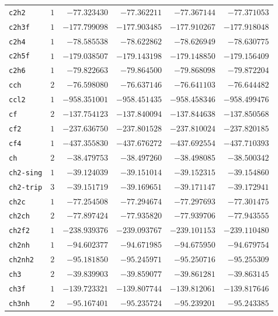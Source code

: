 {\begin{longtable}{@{}lrrrrr@{}}
    \texttt{c2h2} & $1$ & $-77.323430$ & $-77.362211$ & $-77.367144$ & $-77.371053$ \\
    \texttt{c2h3f} & $1$ & $-177.799098$ & $-177.903485$ & $-177.910267$ & $-177.918048$ \\
    \texttt{c2h4} & $1$ & $-78.585538$ & $-78.622862$ & $-78.626949$ & $-78.630775$ \\
    \texttt{c2h5f} & $1$ & $-179.038507$ & $-179.143198$ & $-179.148850$ & $-179.156409$ \\
    \texttt{c2h6} & $1$ & $-79.822663$ & $-79.864500$ & $-79.868098$ & $-79.872204$ \\
    \texttt{cch} & $2$ & $-76.598080$ & $-76.637146$ & $-76.641103$ & $-76.644482$ \\
    \texttt{ccl2} & $1$ & $-958.351001$ & $-958.451435$ & $-958.458346$ & $-958.499476$ \\
    \texttt{cf} & $2$ & $-137.754123$ & $-137.840094$ & $-137.844638$ & $-137.850568$ \\
    \texttt{cf2} & $1$ & $-237.636750$ & $-237.801528$ & $-237.810024$ & $-237.820185$ \\
    \texttt{cf4} & $1$ & $-437.355830$ & $-437.676272$ & $-437.692554$ & $-437.710393$ \\
    \texttt{ch} & $2$ & $-38.479753$ & $-38.497260$ & $-38.498085$ & $-38.500342$ \\
    \texttt{ch2-sing} & $1$ & $-39.124039$ & $-39.151014$ & $-39.152315$ & $-39.154860$ \\
    \texttt{ch2-trip} & $3$ & $-39.151719$ & $-39.169651$ & $-39.171147$ & $-39.172941$ \\
    \texttt{ch2c} & $1$ & $-77.254508$ & $-77.294674$ & $-77.297693$ & $-77.301475$ \\
    \texttt{ch2ch} & $2$ & $-77.897424$ & $-77.935820$ & $-77.939706$ & $-77.943555$ \\
    \texttt{ch2f2} & $1$ & $-238.939376$ & $-239.093767$ & $-239.101153$ & $-239.110480$ \\
    \texttt{ch2nh} & $1$ & $-94.602377$ & $-94.671985$ & $-94.675950$ & $-94.679754$ \\
    \texttt{ch2nh2} & $2$ & $-95.181850$ & $-95.245971$ & $-95.250716$ & $-95.255309$ \\
    \texttt{ch3} & $2$ & $-39.839903$ & $-39.859077$ & $-39.861281$ & $-39.863145$ \\
    \texttt{ch3f} & $1$ & $-139.723321$ & $-139.807744$ & $-139.812061$ & $-139.817646$ \\
    \texttt{ch3nh} & $2$ & $-95.167401$ & $-95.235724$ & $-95.239201$ & $-95.243385$ \\

\end{longtable}}
